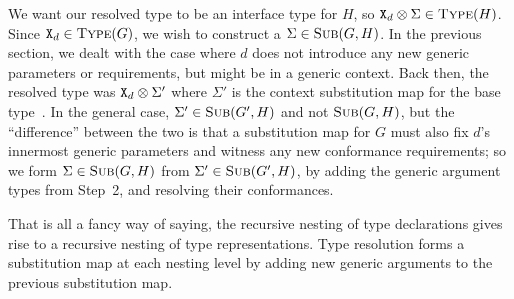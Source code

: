 \documentclass[../generics]{subfiles}
\begin{document}
We want our resolved type to be an interface type for $H$, so $\texttt{X}_d\otimes\Sigma\in\textsc{Type}({H})$. Since $\texttt{X}_d\in\textsc{Type}({G})$, we wish to construct a $\Sigma\in\textsc{Sub}({G, H})$. In the previous section, we dealt with the case where $d$ does not introduce any new generic parameters or requirements, but might be in a generic context. Back then, the resolved type was $\texttt{X}_d\otimes\Sigma'$ where  $\Sigma'$ is the context substitution map for the base type~\tT. In the general case, $\Sigma'\in\textsc{Sub}({G', H})$ and not $\textsc{Sub}({G, H})$, but the ``difference'' between the two is that a substitution map for $G$ must also fix $d$'s innermost generic parameters and witness any new conformance requirements; so we form $\Sigma\in\textsc{Sub}({G, H})$ from $\Sigma'\in\textsc{Sub}({G', H})$, by adding the generic argument types from Step~2, and resolving their conformances.

That is all a fancy way of saying, the recursive nesting of type declarations gives rise to a recursive nesting of type representations. Type resolution forms a substitution map at each nesting level by adding new generic arguments to the previous substitution map.
\end{document}
